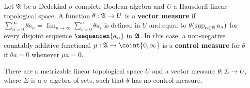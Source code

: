 
Let $\frak A$ be a Dedekind
$\sigma$-complete Boolean algebra and $U$ a Hausdorff linear topological
space.      A function
$\theta:\frak A\to U$ is a {\bf vector measure} if
$\sum_{n=0}^{\infty}\theta a_n=\lim_{n\to\infty}\sum_{i=0}^n\theta a_i$
is defined in $U$ and equal to $\theta(\sup_{n\in\Bbb N}a_n)$ for every
disjoint sequence $\sequencen{a_n}$ in $\frak A$.
In this case, a non-negative countably additive
functional $\mu:\frak A\to\coint{0,\infty}$ is a {\bf control measure}
for $\theta$ if $\theta a=0$ whenever $\mu a=0$.


 There are a metrizable linear topological space
$U$ and a vector measure $\theta:\Sigma\to U$, where $\Sigma$ is a
$\sigma$-algebra of sets, such that $\theta$ has no control measure.

